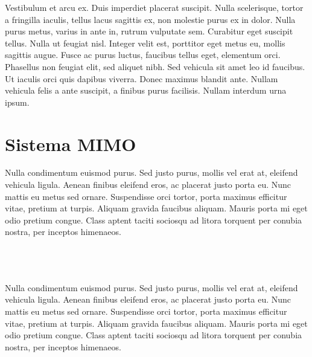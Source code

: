 Vestibulum et arcu ex. Duis imperdiet placerat suscipit. Nulla scelerisque, tortor a fringilla iaculis, tellus lacus sagittis ex, non molestie purus ex in dolor. Nulla purus metus, varius in ante in, rutrum vulputate sem. Curabitur eget suscipit tellus. Nulla ut feugiat nisl. Integer velit est, porttitor eget metus eu, mollis sagittis augue. Fusce ac purus luctus, faucibus tellus eget, elementum orci. Phasellus non feugiat elit, sed aliquet nibh. Sed vehicula sit amet leo id faucibus. Ut iaculis orci quis dapibus viverra. Donec maximus blandit ante. Nullam vehicula felis a ante suscipit, a finibus purus facilisis. Nullam interdum urna ipsum.

\section{Sistema MIMO}
Nulla condimentum euismod purus. Sed justo purus, mollis vel erat at, eleifend vehicula ligula. Aenean finibus eleifend eros, ac placerat justo porta eu. Nunc mattis eu metus sed ornare. Suspendisse orci tortor, porta maximus efficitur vitae, pretium at turpis. Aliquam gravida faucibus aliquam. Mauris porta mi eget odio pretium congue. Class aptent taciti sociosqu ad litora torquent per conubia nostra, per inceptos himenaeos.
\\
\\
\\
\\
Nulla condimentum euismod purus. Sed justo purus, mollis vel erat at, eleifend vehicula ligula. Aenean finibus eleifend eros, ac placerat justo porta eu. Nunc mattis eu metus sed ornare. Suspendisse orci tortor, porta maximus efficitur vitae, pretium at turpis. Aliquam gravida faucibus aliquam. Mauris porta mi eget odio pretium congue. Class aptent taciti sociosqu ad litora torquent per conubia nostra, per inceptos himenaeos.
\\
\\


